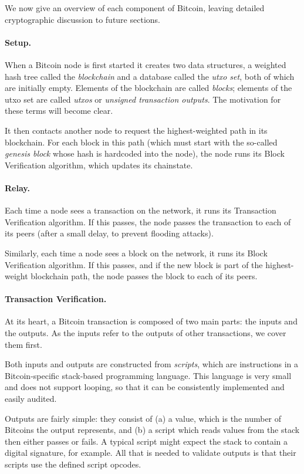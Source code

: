 \documentclass[letterpaper]{article}
\begin{document}
We now give an overview of each component of Bitcoin, leaving detailed
cryptographic discussion to future sections.

\paragraph{Setup.} When a Bitcoin node is first started it creates two
data structures, a weighted hash tree called the \emph{blockchain} and
a database called the \emph{utxo set}, both of which are initially empty.
Elements of the blockchain are called \emph{blocks}; elements of the
utxo set are called \emph{utxos} or \emph{unsigned transaction outputs}.
The motivation for these terms will become clear.

It then contacts another node to request the highest-weighted path in
its blockchain. For each block in this path (which must start with the
so-called \emph{genesis block} whose hash is hardcoded into the node),
the node runs its Block Verification algorithm, which updates its
chainstate.

\paragraph{Relay.} Each time a node sees a transaction on the network,
it runs its Transaction Verification algorithm. If this passes, the
node passes the transaction to each of its peers (after a small delay,
to prevent flooding attacks).

Similarly, each time a node sees a block on the network, it runs its
Block Verification algorithm. If this passes, and if the new block is
part of the highest-weight blockchain path, the node passes the block
to each of its peers.

\paragraph{Transaction Verification.} At its heart, a Bitcoin transaction
is composed of two main parts: the inputs and the outputs. As the inputs
refer to the outputs of other transactions, we cover them first.

Both inputs and outputs are constructed from \emph{scripts}, which are
instructions in a Bitcoin-specific stack-based programming language.
This language is very small and does not support looping, so that it
can be consistently implemented and easily audited.
 
Outputs are fairly simple: they consist of (a) a value, which is the
number of Bitcoins the output represents, and (b) a script which reads
values from the stack then either passes or fails. A typical script
might expect the stack to contain a digital signature, for example.
All that is needed to validate outputs is that their scripts use the
defined script opcodes.
\end{document}

